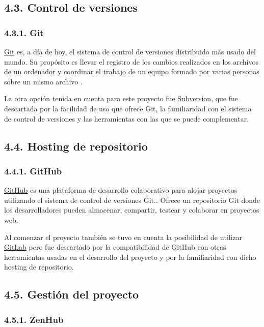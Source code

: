 \subsection{4.3. Control de versiones}

\subsubsection{4.3.1. Git}

\href{https://git-scm.com/}{Git} es, a día de hoy, el sistema de control de versiones distribuido más usado del mundo. Su propósito es llevar el registro de los cambios realizados en los archivos de un ordenador y coordinar el trabajo de un equipo formado por varias personas sobre un mismo archivo \cite{wiki:Git}.

La otra opción tenida en cuenta para este proyecto fue \href{https://subversion.apache.org/}{Subversion}, que fue descartada por la facilidad de uso que ofrece Git, la familiaridad con el sistema de control de versiones y las herramientas con las que se puede complementar.

\subsection{4.4. Hosting de repositorio}

\subsubsection{4.4.1. GitHub}

\href{https://github.com/}{GitHub} es una plataforma de desarrollo colaborativo para alojar proyectos utilizando el sistema de control de versiones Git.\cite{wiki:github}. Ofrece un repositorio Git donde los desarrolladores pueden almacenar, compartir, testear y colaborar en proyectos web.

Al comenzar el proyecto también se tuvo en cuenta la posibilidad de utilizar \href{https://about.gitlab.com/}{GitLab} pero fue descartado por la compatibilidad de GitHub con otras herramientas usadas en el desarrollo del proyecto y por la familiaridad con dicho hosting de repositorio.

\subsection{4.5. Gestión del proyecto }

\subsubsection{4.5.1. ZenHub}

